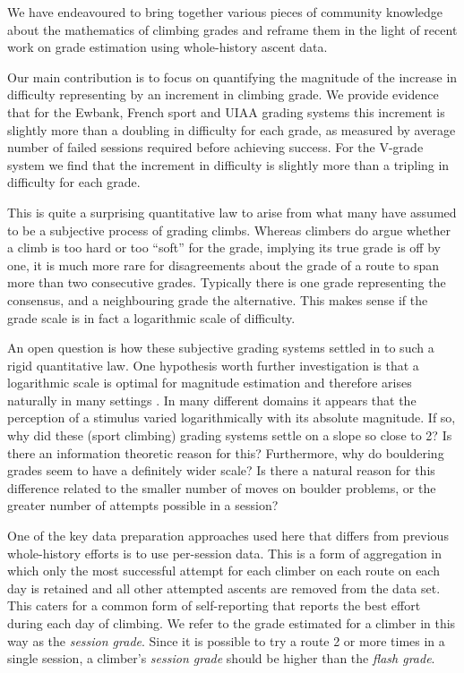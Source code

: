 \documentclass[ba]{imsart}
\begin{document}
We have endeavoured to bring together various pieces of community knowledge about the mathematics of climbing grades and reframe them in the light of recent work on grade estimation using whole-history ascent data.

Our main contribution is to focus on quantifying the magnitude of the increase in difficulty representing by an increment in climbing grade. We provide evidence that for the Ewbank, French sport and UIAA grading systems this increment is slightly more than a doubling in difficulty for each grade, as measured by average number of failed sessions required before achieving success. For the V-grade system we find that the increment in difficulty is slightly more than a tripling in difficulty for each grade.

This is quite a surprising quantitative law to arise from what many have assumed to be a subjective process of grading climbs. Whereas climbers do argue whether a climb is too hard or too ``soft'' for the grade, implying its true grade is off by one, it is much more rare for disagreements about the grade of a route to span more than two consecutive grades. Typically there is one grade representing the consensus, and a neighbouring grade the alternative. This makes sense if the grade scale is in fact a logarithmic scale of difficulty.

An open question is how these subjective grading systems settled in to such a rigid quantitative law. One hypothesis worth further investigation is that a logarithmic scale is optimal for magnitude estimation and therefore arises naturally in many settings \citep{portugal2011weber}. In many different domains it appears that the perception of a stimulus varied logarithmically with its absolute magnitude. If so, why did these (sport climbing) grading systems settle on a slope so close to 2? Is there an information theoretic reason for this? Furthermore, why do bouldering grades seem to have a definitely wider scale? Is there a natural reason for this difference related to the smaller number of moves on boulder problems, or the greater number of attempts possible in a session?

One of the key data preparation approaches used here that differs from previous whole-history efforts is to use per-session data. This is a form of aggregation in which only the most successful attempt for each climber on each route on each day is retained and all other attempted ascents are removed from the data set. This caters for a common form of self-reporting that reports the best effort during each day of climbing. We refer to the grade estimated for a climber in this way as the {\it session grade}. Since it is possible to try a route 2 or more times in a single session, a climber's {\it session grade} should be higher than the {\it flash grade}.
\end{document}
